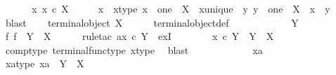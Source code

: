 \begin{isabellebody}
\ \ \isamarkupfalse%
\isanewline
{}\isamarkupfalse%
\isanewline
\ \ \isamarkupfalse%
\ {\isachardoublequoteopen}{\isasymexists}{\isacharbang}{\kern0pt}x{\isachardot}{\kern0pt}\ x\ {\isasymin}\isactrlsub c\ X{\isachardoublequoteclose}\isanewline
\ \ \isamarkupfalse%
\ \isamarkupfalse%
\ x\ \ x{\isacharunderscore}{\kern0pt}type{\isacharcolon}{\kern0pt}\ {\isachardoublequoteopen}x\ {\isacharcolon}{\kern0pt}\ one\ {\isasymrightarrow}\ X{\isachardoublequoteclose}\ \ x{\isacharunderscore}{\kern0pt}unique{\isacharcolon}{\kern0pt}\ {\isachardoublequoteopen}{\isasymforall}\ y{\isachardot}{\kern0pt}\ y\ {\isacharcolon}{\kern0pt}\ one\ {\isasymrightarrow}\ X\ {\isasymlongrightarrow}\ x\ {\isacharequal}{\kern0pt}\ y{\isachardoublequoteclose}\isanewline
\ \ \ \ \isamarkupfalse%
\ blast\isanewline
\ \ \isamarkupfalse%
\ {\isachardoublequoteopen}terminal{\isacharunderscore}{\kern0pt}object\ X{\isachardoublequoteclose}\isanewline
\ \ \ \ \isamarkupfalse%
\ terminal{\isacharunderscore}{\kern0pt}object{\isacharunderscore}{\kern0pt}def\ \ \isanewline
\ \ \isamarkupfalse%
\ \isanewline
\ \ \ \ \isamarkupfalse%
\ Y\isanewline
\ \ \ \ \isamarkupfalse%
\ {\isachardoublequoteopen}{\isasymexists}{\isacharbang}{\kern0pt}f{\isachardot}{\kern0pt}\ f\ {\isacharcolon}{\kern0pt}\ Y\ {\isasymrightarrow}\ X{\isachardoublequoteclose}\isanewline
\ \ \ \ \isamarkupfalse%
\ {\isacharparenleft}{\kern0pt}rule{\isacharunderscore}{\kern0pt}tac\ a{\isacharequal}{\kern0pt}{\isachardoublequoteopen}x\ {\isasymcirc}\isactrlsub c\ {\isasymbeta}\isactrlbsub Y\isactrlesub {\isachardoublequoteclose}\ \ ex{}I{\isacharparenright}{\kern0pt}\isanewline
\ \ \ \ \ \ \isamarkupfalse%
\ {\isachardoublequoteopen}x\ {\isasymcirc}\isactrlsub c\ {\isasymbeta}\isactrlbsub Y\isactrlesub \ {\isacharcolon}{\kern0pt}\ Y\ {\isasymrightarrow}\ X{\isachardoublequoteclose}\isanewline
\ \ \ \ \ \ \ \ \isamarkupfalse%
\ comp{\isacharunderscore}{\kern0pt}type\ terminal{\isacharunderscore}{\kern0pt}func{\isacharunderscore}{\kern0pt}type\ x{\isacharunderscore}{\kern0pt}type\ \isamarkupfalse%
\ blast\isanewline
\ \ \ \ \isamarkupfalse%
\isanewline
\ \ \ \ \ \ \isamarkupfalse%
\ xa\isanewline
\ \ \ \ \ \ \isamarkupfalse%
\ xa{\isacharunderscore}{\kern0pt}type{\isacharcolon}{\kern0pt}\ {\isachardoublequoteopen}xa\ {\isacharcolon}{\kern0pt}\ Y\ {\isasymrightarrow}\ X{\isachardoublequoteclose}\isanewline

\end{isabellebody}
